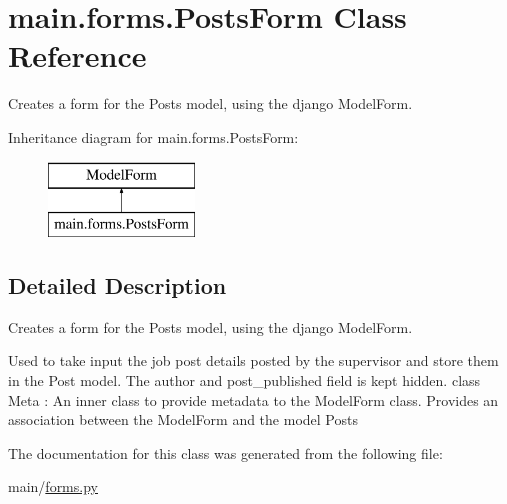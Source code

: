 \hypertarget{classmain_1_1forms_1_1PostsForm}{}\section{main.\+forms.\+Posts\+Form Class Reference}
\label{classmain_1_1forms_1_1PostsForm}


Creates a form for the Posts model, using the django Model\+Form.  


Inheritance diagram for main.\+forms.\+Posts\+Form\+:\begin{figure}[H]
\begin{center}
\leavevmode
\includegraphics[height=2.000000cm]{classmain_1_1forms_1_1PostsForm}
\end{center}
\end{figure}


\subsection{Detailed Description}
Creates a form for the Posts model, using the django Model\+Form. 

Used to take input the job post details posted by the supervisor and store them in the Post model. The author and post\+\_\+published field is kept hidden. class Meta \+: An inner class to provide metadata to the Model\+Form class. Provides an association between the Model\+Form and the model Posts 

The documentation for this class was generated from the following file\+:\begin{DoxyCompactItemize}
\item 
main/\hyperlink{forms_8py}{forms.\+py}\end{DoxyCompactItemize}
